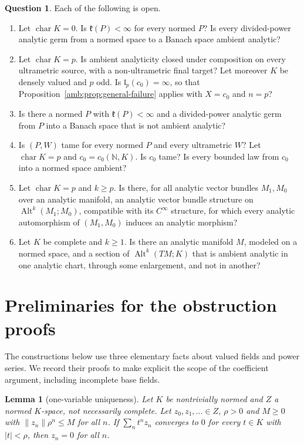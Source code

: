 \documentclass[11pt]{amsart}
\newtheorem{lemma}[theorem]{Lemma}
\theoremstyle{definition}
\theoremstyle{remark}
\numberwithin{equation}{section}
\newcommand{\N}{\mathbb N}
\newcommand{\Alt}{\operatorname{Alt}}
\newcommand{\abs}[1]{\lvert #1\rvert}
\newcommand{\norm}[1]{\lVert #1\rVert}
\theoremstyle{plain}
\theoremstyle{definition}
\newtheorem{question}[theorem]{Question}
\theoremstyle{plain}
\begin{document}
\begin{question}\label{amb:q:open}
Each of the following is open.
\begin{enumerate}
\item Let $\operatorname{char}K=0$. Is $\mathfrak k(P)<\infty$ for every normed $P$? Is every divided-power analytic germ from a normed space to a Banach space ambient analytic?
\item Let $\operatorname{char}K=p$. Is ambient analyticity closed under composition on every ultrametric source, with a non-ultrametric final target? Let moreover $K$ be densely valued and $p$ odd. Is $\mathfrak l_p(c_0)=\infty$, so that Proposition~\ref{amb:prop:general-failure} applies with $X=c_0$ and $n=p$?
\item Is there a normed $P$ with $\mathfrak k(P)<\infty$ and a divided-power analytic germ from $P$ into a Banach space that is not ambient analytic?
\item Is $(P,W)$ tame for every normed $P$ and every ultrametric $W$? Let $\operatorname{char}K=p$ and $c_0=c_0(\N,K)$. Is $c_0$ tame? Is every bounded law from $c_0$ into a normed space ambient?
\item Let $\operatorname{char}K=p$ and $k\ge p$. Is there, for all analytic vector bundles $M_1,M_0$ over an analytic manifold, an analytic vector bundle structure on $\Alt^k(M_1;M_0)$, compatible with its $C^\infty$ structure, for which every analytic automorphism of $(M_1,M_0)$ induces an analytic morphism?
\item Let $K$ be complete and $k\ge1$. Is there an analytic manifold $M$, modeled on a normed space, and a section of $\Alt^k(TM;K)$ that is ambient analytic in one analytic chart, through some enlargement, and not in another?
\end{enumerate}
\end{question}
\appendix
\section{Preliminaries for the obstruction proofs}\label{app:obstruction-preliminaries}
The constructions below use three elementary facts about valued fields and power series. We record their proofs to make explicit the scope of the coefficient argument, including incomplete base fields.

\begin{lemma}[one-variable uniqueness]\label{lem:unique}
Let $K$ be nontrivially normed and $Z$ a normed $K$\nobreakdash-space, not necessarily complete. Let $z_0,z_1,\ldots\in Z$, $\rho>0$
and $M\ge0$ with $\norm{z_n}\rho^n\le M$ for all $n$. If $\sum_nt^nz_n$ converges to $0$ for every $t\in K$ with
$\abs t<\rho$, then $z_n=0$ for all $n$.
\end{lemma}
\end{document}
